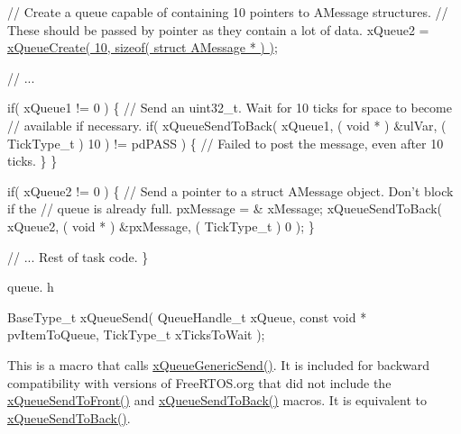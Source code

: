 \begin{DoxyPre} // Create a queue capable of containing 10 pointers to AMessage structures.
 // These should be passed by pointer as they contain a lot of data.
 xQueue2 = \hyperlink{vendor_2ceedling_2plugins_2freertos_2src_2freertos_2include_2queue_8h_aeb858b824bd74a934ea7ebb81af2a6bb}{xQueueCreate( 10, sizeof( struct AMessage * ) )};\end{DoxyPre}



\begin{DoxyPre} // ...\end{DoxyPre}



\begin{DoxyPre} if( xQueue1 != 0 )
 \{
     // Send an uint32\_t.  Wait for 10 ticks for space to become
     // available if necessary.
     if( xQueueSendToBack( xQueue1, ( void * ) \&ulVar, ( TickType\_t ) 10 ) != pdPASS )
     \{
         // Failed to post the message, even after 10 ticks.
     \}
 \}\end{DoxyPre}



\begin{DoxyPre} if( xQueue2 != 0 )
 \{
     // Send a pointer to a struct AMessage object.  Don't block if the
     // queue is already full.
     pxMessage = \& xMessage;
     xQueueSendToBack( xQueue2, ( void * ) \&pxMessage, ( TickType\_t ) 0 );
 \}\end{DoxyPre}



\begin{DoxyPre} // ... Rest of task code.
\}
\end{DoxyPre}


queue. h 
\begin{DoxyPre}
BaseType\_t xQueueSend(
                           QueueHandle\_t xQueue,
                           const void * pvItemToQueue,
                           TickType\_t xTicksToWait
                      );
\end{DoxyPre}


This is a macro that calls \hyperlink{externals_2freertos_2include_2queue_8h_a7ce86d1026e0c3055a523935bf53c0b3}{x\+Queue\+Generic\+Send()}. It is included for backward compatibility with versions of Free\+R\+T\+O\+S.\+org that did not include the \hyperlink{vendor_2ceedling_2plugins_2freertos_2src_2freertos_2include_2queue_8h_aa612fcc2b1ceee0200f34b942e300b41}{x\+Queue\+Send\+To\+Front()} and \hyperlink{vendor_2ceedling_2plugins_2freertos_2src_2freertos_2include_2queue_8h_a81d24a2c1199d58efb76fbee15853112}{x\+Queue\+Send\+To\+Back()} macros. It is equivalent to \hyperlink{vendor_2ceedling_2plugins_2freertos_2src_2freertos_2include_2queue_8h_a81d24a2c1199d58efb76fbee15853112}{x\+Queue\+Send\+To\+Back()}.

